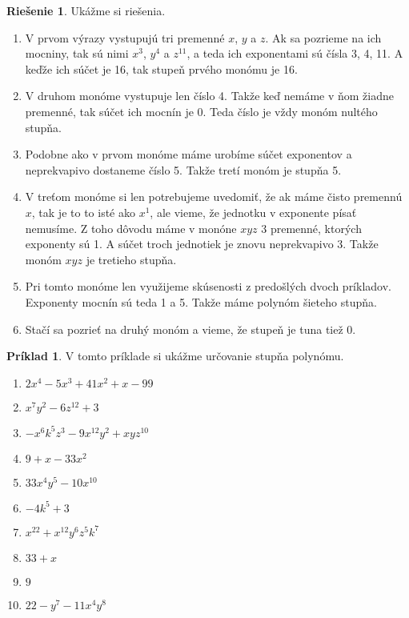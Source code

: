 \documentclass[12pt, twopage]{article}
\theoremstyle{definition}
\newtheorem{example}{Príklad}
\theoremstyle{definition}
\newtheorem{solution}{Riešenie}
\theoremstyle{definition}
\begin{document}
	\begin{solution}
		Ukážme si riešenia. 
		
		\begin{enumerate}
			\item V prvom výrazy vystupujú tri premenné $x$, $y$ a $z$. Ak sa pozrieme na ich mocniny, tak sú nimi $x^3$, $y^4$ a $z^{11}$, a teda ich exponentami sú čísla 3, 4, 11. A keďže ich súčet je 16, tak stupeň prvého monómu je 16.
			\item V druhom monóme vystupuje len číslo 4. Takže keď nemáme v ňom žiadne premenné, tak súčet ich mocnín je 0. Teda číslo je vždy monóm nultého stupňa.
			\item Podobne ako v prvom monóme máme urobíme súčet exponentov a neprekvapivo dostaneme číslo 5. Takže tretí monóm je stupňa 5.
			\item V treťom monóme si len potrebujeme uvedomiť, že ak máme čisto premennú $x$, tak je to to isté ako $x^1$, ale vieme, že jednotku v exponente písať nemusíme. Z toho dôvodu máme v monóne $xyz$ 3 premenné, ktorých exponenty sú 1. A súčet troch jednotiek je znovu neprekvapivo 3. Takže monóm $xyz$ je tretieho stupňa. 
			\item Pri tomto monóme len využijeme skúsenosti z predošlých dvoch príkladov. Exponenty mocnín sú teda 1 a 5. Takže máme polynóm šieteho stupňa.
			\item Stačí sa pozrieť na druhý monóm a vieme, že stupeň je tuna tiež 0.
		\end{enumerate}
	\end{solution}
	
	\begin{example}
		V tomto príklade si ukážme určovanie stupňa polynómu.
		
		\begin{enumerate}
			\item $2x^4 - 5x^3 + 41x^2 + x - 99$
			\item $x^7y^2 - 6z^{12} + 3$
			\item $-x^6k^5z^3 - 9x^12y^2 + xyz^{10}$
			\item $9 + x - 33x^2$
			\item $33x^4y^5 - 10x^{10}$
			\item $-4k^5 + 3$
			\item $x^{22} + x^{12}y^6z^5k^7$
			\item $33 + x$
			\item $9$
			\item $22 - y^7 - 11x^4y^8$
		\end{enumerate}
	\end{example}
	
\end{document}
